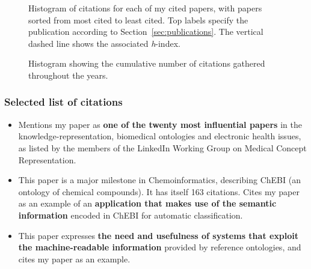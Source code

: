 \begin{figure}[H]
    \centering
    
    \caption{Histogram of citations for each of my cited papers, with papers sorted from most cited to least cited. Top labels specify the publication according to Section~\ref{sec:publications}. The vertical dashed line shows the associated \textit{h}-index.}
    \label{fig:histogram-h-index}
\end{figure}

\begin{figure}[H]
    \centering
    
    \caption{Histogram showing the cumulative number of citations gathered throughout the years.}
    \label{fig:histogram-citations}
\end{figure}


\subsubsection{Selected list of citations}

\begin{refsection}
\end{refsection}
\begin{itemize}
    \item Mentions my paper \autocite{Ferreira2012a} as \textbf{one of the twenty most influential papers} in the knowledge-representation, biomedical ontologies and electronic health issues, as listed by the members of the LinkedIn Working Group on Medical Concept Representation.
\end{itemize}

\begin{refsection}
\end{refsection}
\begin{itemize}
    \item This paper is a major milestone in Chemoinformatics, describing ChEBI (an ontology of chemical compounds). It has itself 163 citations. Cites my paper \autocite{Ferreira2010} as an example of an \textbf{application that makes use of the semantic information} encoded in ChEBI for automatic classification.
\end{itemize}

\begin{refsection}
\end{refsection}
\begin{itemize}
    \item This paper expresses \textbf{the need and usefulness of systems that exploit the machine-readable information} provided by reference ontologies, and cites my paper \autocite{Ferreira2010} as an example.
\end{itemize}

